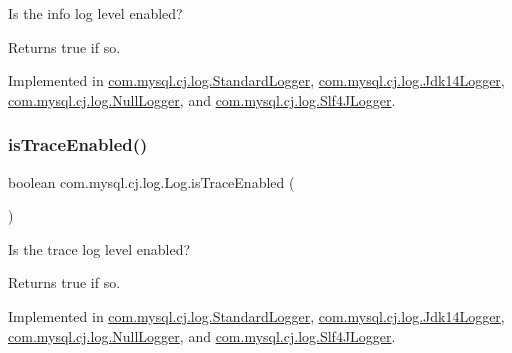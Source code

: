 Is the \textquotesingle{}info\textquotesingle{} log level enabled?

\begin{DoxyReturn}{Returns}
true if so. 
\end{DoxyReturn}


Implemented in \mbox{\hyperlink{classcom_1_1mysql_1_1cj_1_1log_1_1_standard_logger_afa3c624bf9920c0131a8d0581c571ef8}{com.\+mysql.\+cj.\+log.\+Standard\+Logger}}, \mbox{\hyperlink{classcom_1_1mysql_1_1cj_1_1log_1_1_jdk14_logger_ac01fd7e8de57ff3e72b588c86dcf7e32}{com.\+mysql.\+cj.\+log.\+Jdk14\+Logger}}, \mbox{\hyperlink{classcom_1_1mysql_1_1cj_1_1log_1_1_null_logger_af0ad62bbe84bd85359d474e58cd94316}{com.\+mysql.\+cj.\+log.\+Null\+Logger}}, and \mbox{\hyperlink{classcom_1_1mysql_1_1cj_1_1log_1_1_slf4_j_logger_ab21b243a10ab8a46a4706658298ecd5e}{com.\+mysql.\+cj.\+log.\+Slf4\+J\+Logger}}.

\mbox{\label{interfacecom_1_1mysql_1_1cj_1_1log_1_1_log_a814070e176d987da656b45662bc63ccd}} 
\subsubsection{\texorpdfstring{is\+Trace\+Enabled()}{isTraceEnabled()}}
{\footnotesize\ttfamily boolean com.\+mysql.\+cj.\+log.\+Log.\+is\+Trace\+Enabled (\begin{DoxyParamCaption}{ }\end{DoxyParamCaption})}

Is the \textquotesingle{}trace\textquotesingle{} log level enabled?

\begin{DoxyReturn}{Returns}
true if so. 
\end{DoxyReturn}


Implemented in \mbox{\hyperlink{classcom_1_1mysql_1_1cj_1_1log_1_1_standard_logger_afb271f7134e427754d35ae250b222f9e}{com.\+mysql.\+cj.\+log.\+Standard\+Logger}}, \mbox{\hyperlink{classcom_1_1mysql_1_1cj_1_1log_1_1_jdk14_logger_abc67efb3ab231c21151dba192b032919}{com.\+mysql.\+cj.\+log.\+Jdk14\+Logger}}, \mbox{\hyperlink{classcom_1_1mysql_1_1cj_1_1log_1_1_null_logger_aec3c94f0980a5539603a7ab12b270356}{com.\+mysql.\+cj.\+log.\+Null\+Logger}}, and \mbox{\hyperlink{classcom_1_1mysql_1_1cj_1_1log_1_1_slf4_j_logger_afbf9106392050f7ca64b0ad7582b7517}{com.\+mysql.\+cj.\+log.\+Slf4\+J\+Logger}}.

